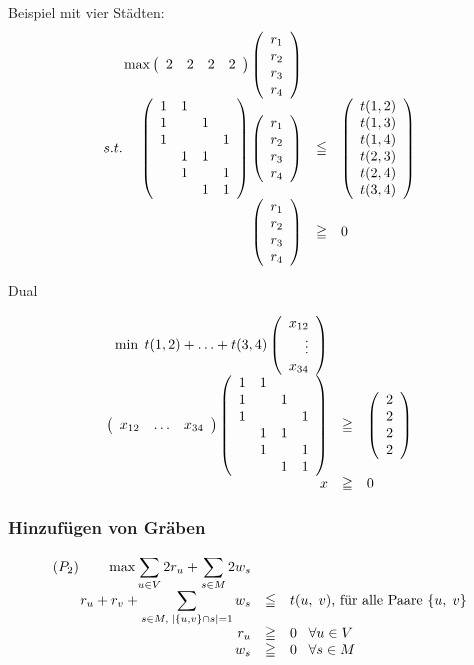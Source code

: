 Beispiel mit vier Städten:\\\nopagebreak
\[\begin{array}{rcl}
\max \mat{rrrr}{2&2&2&2} \vect{r_{1}\\r_{2}\\r_{3}\\r_{4}}\\
s.t. \hspace {4mm} \mat{rrrr}{1&1&&\\1&&1&\\1&&&1\\&1&1&\\&1&&1\\&&1&1}
\vect{r_{1}\\r_{2}\\r_{3}\\r_{4}}
&\leqq&\vect{t(1,2)\\t(1,3)\\t(1,4)\\t(2,3)\\t(2,4)\\t(3,4)}\\
\vect{r_{1}\\r_{2}\\r_{3}\\r_{4}} &\geqq& 0
\end{array}\]

Dual

\[\begin{array}{rcl}
\min \; t(1,2)+\ldots+t(3,4) \vect{x_{12}\\\vdots\\x_{34}}\\
\mat{rrr}{x_{12}&\ldots&x_{34}}
\mat{rrrr}{1&1&&\\1&&1&\\1&&&1\\&1&1&\\&1&&1\\&&1&1} &\geqq&
\vect{2\\2\\2\\2}\\
x&\geqq& 0
\end{array}\]

\subsubsection{Hinzufügen von Gräben}

\[\begin{array}{rcl}
(P_{2}) \hspace{7mm}  \max \displaystyle \sum_{u \in V} 2r_{u}
+ \sum_{s\in M} 2 w_{s}\\
r_{u} + r_{v} + \displaystyle \sum_{s \in M, \; \left| \{u,v\} \cap s 
\right| =1} w_{s}&\leqq& t(u,\; v) \mbox{, für alle Paare }\{u,\; v\}\\
r_{u} &\geqq&0 \; \; \; \forall u\in V\\
w_{s} &\geqq& 0 \; \; \; \forall s \in M
\end{array}
\]

